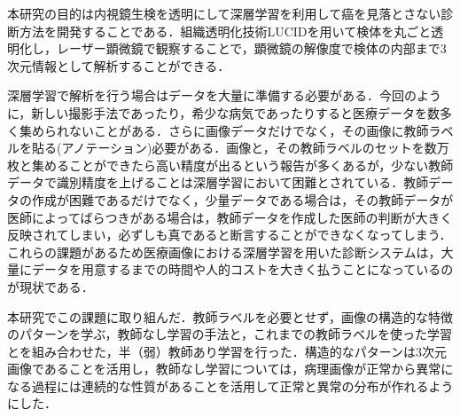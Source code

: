 本研究の目的は内視鏡生検を透明にして深層学習を利用して癌を見落とさない診断方法を開発することである．組織透明化技術LUCIDを用いて検体を丸ごと透明化し，レーザー顕微鏡で観察することで，顕微鏡の解像度で検体の内部まで3次元情報として解析することができる．



深層学習で解析を行う場合はデータを大量に準備する必要がある．今回のように，新しい撮影手法であったり，希少な病気であったりすると医療データを数多く集められないことがある．さらに画像データだけでなく，その画像に教師ラベルを貼る(アノテーション)必要がある．画像と，その教師ラベルのセットを数万枚と集めることができたら高い精度が出るという報告が多くあるが，少ない教師データで識別精度を上げることは深層学習において困難とされている．教師データの作成が困難であるだけでなく，少量データである場合は，その教師データが医師によってばらつきがある場合は，教師データを作成した医師の判断が大きく反映されてしまい，必ずしも真であると断言することができなくなってしまう．これらの課題があるため医療画像における深層学習を用いた診断システムは，大量にデータを用意するまでの時間や人的コストを大きく払うことになっているのが現状である．

本研究でこの課題に取り組んだ．教師ラベルを必要とせず，画像の構造的な特徴のパターンを学ぶ，教師なし学習の手法と，これまでの教師ラベルを使った学習とを組み合わせた，半（弱）教師あり学習を行った．構造的なパターンは3次元画像であることを活用し，教師なし学習については，病理画像が正常から異常になる過程には連続的な性質があることを活用して正常と異常の分布が作れるようにした．
